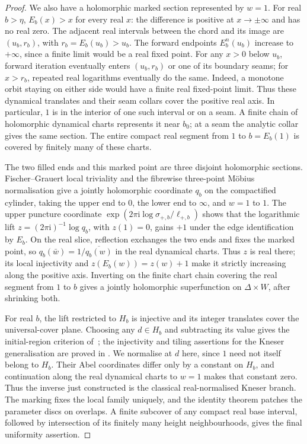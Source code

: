 \documentclass[11pt,a4paper]{article}
\theoremstyle{definition}
\newcommand{\ii}{\mathrm{i}}
\begin{document}
\begin{proof}
We also have a holomorphic marked section represented by $w=1$.
For real $b>\eta$, $E_b(x)>x$ for every real $x$: the difference is
positive at $x\to\pm\infty$ and has no real zero.  The adjacent real
intervals between the chord and its image are $(u_b,r_b)$, with
$r_b=E_b(u_b)>u_b$.  The forward endpoints $E_b^n(u_b)$ increase to
$+\infty$, since a finite limit would be a real fixed point.  For any
$x>0$ below $u_b$, forward iteration eventually enters $(u_b,r_b)$
or one of its boundary seams; for $x>r_b$, repeated real logarithms
eventually do the same.
Indeed, a monotone orbit staying on either side would have a finite
real fixed-point limit.  Thus these dynamical translates and their
seam collars cover the positive real axis.  In particular, $1$ is
in the interior of one such interval or on a seam.  A finite chain of
holomorphic dynamical charts represents it near $b_0$; at a seam the
analytic collar gives the same section.  The entire compact real
segment from $1$ to $b=E_b(1)$ is covered by finitely many of these
charts.

The two filled ends and this marked point are three disjoint
holomorphic sections.  Fischer--Grauert local triviality
\cite{FischerGrauert1965} and the fibrewise three-point M\"obius
normalisation give a jointly holomorphic coordinate $q_b$ on the
compactified cylinder, taking the upper end to $0$, the lower end to
$\infty$, and $w=1$ to $1$.  The upper puncture coordinate
$\exp(2\pi\ii\log\sigma_{+,b}/\ell_{+,b})$ shows that the logarithmic
lift $z=(2\pi\ii)^{-1}\log q_b$, with $z(1)=0$, gains $+1$ under the edge
identification by $E_b$.  On the real slice, reflection exchanges the
two ends and fixes the marked point, so $q_b(\bar w)=1/\overline{q_b(w)}$
in the real dynamical charts.  Thus $z$ is real there; its local
injectivity and $z(E_b(w))=z(w)+1$ make it strictly increasing along
the positive axis.  Inverting on the finite
chart chain covering the real segment from $1$ to $b$ gives a jointly
holomorphic superfunction on $\Delta\times W$, after shrinking both.

For real $b$, the lift restricted to $H_b$ is injective and its integer
translates cover the universal-cover plane.  Choosing any $d\in H_b$
and subtracting its value gives the initial-region criterion
of~\cite[Thm.~1]{TrappmannKouznetsov2011}; the injectivity and tiling
assertions for the Kneser generalisation are proved in
\cite[Thm.~5]{TrappmannKouznetsov2011}.  We normalise at $d$ here,
since $1$ need not itself belong to $H_b$.
Their Abel coordinates differ only by a constant on $H_b$, and
continuation along the real dynamical charts to $w=1$ makes that
constant zero.  Thus the inverse just
constructed is the classical real-normalised Kneser branch.
The marking fixes the local family uniquely, and the identity theorem
patches the parameter discs on overlaps.  A finite subcover of any
compact real base interval, followed by intersection of its finitely
many height neighbourhoods, gives the final uniformity assertion.
\end{proof}
\end{document}
